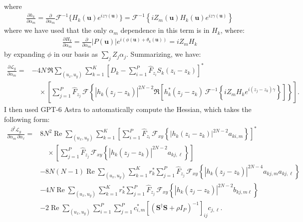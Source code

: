 \documentclass{article}
\begin{document}
where
\begin{align}
\frac{\partial h_k}{\partial \alpha_m} = \frac{\partial}{\partial \alpha_m} \mathcal{F}^{-1} \{H_k(\mathbf{u}) e^{i z \gamma(\mathbf{u})}\} = \mathcal{F}^{-1} \left\{i Z_m(\mathbf{u}) H_k(\mathbf{u}) e^{iz \gamma(\mathbf{u})} \right\}
\end{align}
where we have used that the only $\alpha_m$ dependence in this term is in $H_k$, where:
\begin{align}
\frac{\partial H_k}{\partial \alpha_m} = \frac{\partial }{\partial \alpha_m} |P(\mathbf{u})| e^{i \left(\phi(\mathbf{u}) +  \theta_k(\mathbf{u})\right)} = i Z_m H_k
\end{align}
by expanding $\phi$ in our basis as $\sum_j Z_j \alpha_j$. Summarizing, we have:
\begin{equation}
\begin{aligned}
\frac{\partial \mathcal{L}_g}{\partial \alpha_m} ={}& -4N\,\Re \sum_{(u_x,u_y)} \sum_{k=1}^{K} \left[D_k-\sum_{i=1}^{P}\hat{F}_{z_i}S_k(z_i-z_k)\right]^*
\\&\quad\times\left[\sum_{j=1}^{P}\hat{F}_{z_j}\,\mathcal{F}\left\{\left|h_k(z_j-z_k)\right|^{2N-2}\Re\left[h_k^*(z_j-z_k)\,\mathcal{F}^{-1}\left\{iZ_mH_k e^{i(z_j-z_k)\gamma}\right\}\right]\right\}\right].
\end{aligned}
\end{equation}
I then used GPT-6 Astra to automatically compute the Hessian, which takes the following form:
\begin{equation}
\begin{aligned}
\frac{\partial^2 \mathcal{L}_g}
{\partial\alpha_m\,\partial\alpha_\ell}
={}&
8N^2\operatorname{Re}
\sum_{(u_x,u_y)}\sum_{k=1}^{K}
\left[
\sum_{i=1}^{P}\widehat F_{z_i}\,
\mathcal F_{xy}
\left\{
|h_k(z_i-z_k)|^{2N-2}a_{ki,m}
\right\}
\right]^*
\\
&\quad\times
\left[
\sum_{j=1}^{P}\widehat F_{z_j}\,
\mathcal F_{xy}
\left\{
|h_k(z_j-z_k)|^{2N-2}a_{kj,\ell}
\right\}
\right]
\\[4pt]
&-
8N(N-1)\operatorname{Re}
\sum_{(u_x,u_y)}\sum_{k=1}^{K}
r_k^*
\sum_{j=1}^{P}\widehat F_{z_j}\,
\mathcal F_{xy}
\left\{
|h_k(z_j-z_k)|^{2N-4}a_{kj,m}a_{kj,\ell}
\right\}
\\[4pt]
&-
4N\operatorname{Re}
\sum_{(u_x,u_y)}\sum_{k=1}^{K}
r_k^*
\sum_{j=1}^{P}\widehat F_{z_j}\,
\mathcal F_{xy}
\left\{
|h_k(z_j-z_k)|^{2N-2}b_{kj,m\ell}
\right\}
\\[4pt]
&-
2\operatorname{Re}
\sum_{(u_x,u_y)}
\sum_{i=1}^{P}\sum_{j=1}^{P}
c_{i,m}^*
\left[
\left(\mathbf S^\dagger\mathbf S+\rho I_P\right)^{-1}
\right]_{ij}
c_{j,\ell}.
\end{aligned}
\end{equation}
\end{document}
